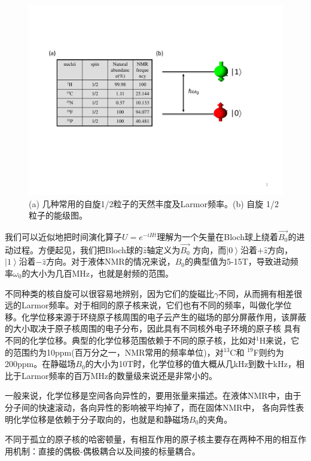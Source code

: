 \begin{figure}[htbp]
            \begin{center}
              \includegraphics[width= 0.8\columnwidth]{figures/spinhalf.pdf}
              \caption{(a) 几种常用的自旋1/2粒子的天然丰度及Larmor频率。(b) 自旋 1/2粒子的能级图。
              }
              \label{spinhalf}
            \end{center}
\end{figure}

我们可以近似地把时间演化算子$U=e^{-iHt}$理解为一个矢量在Bloch球上绕着$\overrightarrow{B_0}$的进动过程。方便起见，我们把Bloch球的$\hat{z}$轴定义为$\overrightarrow{B_0}$
方向，而$\left\vert  0 \right\rangle$沿着$+\hat{z}$方向，$\left\vert  1 \right\rangle$沿着$-\hat{z}$方向。对于液体NMR的情况来说，$B_0$的典型值为5-15T，导致进动频率$\omega_0$的大小为几百MHz，也就是射频的范围。

不同种类的核自旋可以很容易地辨别，因为它们的旋磁比$\gamma$不同，从而拥有相差很远的Larmor频率。对于相同的原子核来说，它们也有不同的频率，叫做化学位移。化学位移来源于环绕原子核周围的电子云产生的磁场的部分屏蔽作用，该屏蔽的大小取决于原子核周围的电子分布，因此具有不同核外电子环境的原子核
具有不同的化学位移。典型的化学位移范围依赖于不同的原子核，比如对$^1$H来说，它的范围约为10ppm(百万分之一，NMR常用的频率单位)，对$^{13}$C和
$^{19}$F则约为200ppm。在静磁场$B_0$的大小为10T时，化学位移的值大概从几kHz到数十kHz，相比于Larmor频率的百万MHz的数量级来说还是非常小的。

一般来说，化学位移是空间各向异性的，要用张量来描述。在液体NMR中，由于分子间的快速滚动，各向异性的影响被平均掉了，而在固体NMR中，
各向异性表明化学位移是依赖于分子取向的，也就是和静磁场$B_0$的夹角。

不同于孤立的原子核的哈密顿量，有相互作用的原子核主要存在两种不用的相互作用机制：直接的偶极-偶极耦合以及间接的标量耦合。

